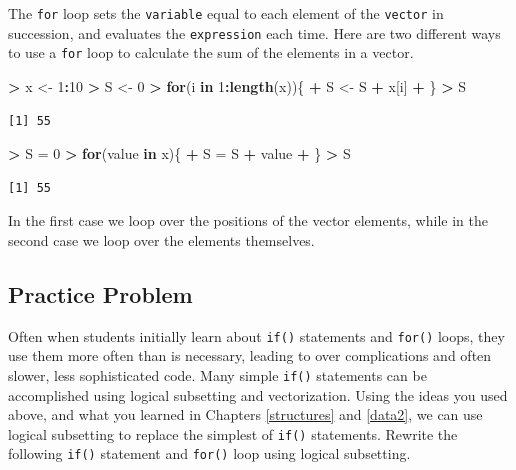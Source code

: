 \documentclass[]{krantz}
\makeatletter
\newenvironment{Shaded}{\begin{snugshade}}{\end{snugshade}}
\newcommand{\KeywordTok}[1]{\textcolor[rgb]{0.27,0.27,0.27}{\textbf{#1}}}
\newcommand{\DecValTok}[1]{\textcolor[rgb]{0.06,0.06,0.06}{#1}}
\newcommand{\StringTok}[1]{\textcolor[rgb]{0.5,0.5,0.5}{#1}}
\newcommand{\ControlFlowTok}[1]{\textcolor[rgb]{0.27,0.27,0.27}{\textbf{#1}}}
\newcommand{\OperatorTok}[1]{\textcolor[rgb]{0.43,0.43,0.43}{\textbf{#1}}}
\newcommand{\NormalTok}[1]{#1}
\newenvironment{kframe}{%
\medskip{}
\setlength{\fboxsep}{.8em}
 \def\at@end@of@kframe{}%
 \ifinner\ifhmode%
  \def\at@end@of@kframe{\end{minipage}}%
  \begin{minipage}{\columnwidth}%
 \fi\fi%
 \def\FrameCommand##1{\hskip\@totalleftmargin \hskip-\fboxsep
 \colorbox{shadecolor}{##1}\hskip-\fboxsep
     \hskip-\linewidth \hskip-\@totalleftmargin \hskip\columnwidth}%
 \MakeFramed {\advance\hsize-\width
   \@totalleftmargin\z@ \linewidth\hsize
   \@setminipage}}%
 {\par\unskip\endMakeFramed%
 \at@end@of@kframe}
\renewenvironment{Shaded}{\begin{kframe}}{\end{kframe}}
\makeatother
\begin{document}
The \texttt{for} loop sets the \texttt{variable} equal to each element
of the \texttt{vector} in succession, and evaluates the
\texttt{expression} each time. Here are two different ways to use a
\texttt{for} loop to calculate the sum of the elements in a vector.

\begin{Shaded}
\begin{Highlighting}[]
\OperatorTok{>}\StringTok{ }\NormalTok{x <-}\StringTok{ }\DecValTok{1}\OperatorTok{:}\DecValTok{10}
\OperatorTok{>}\StringTok{ }\NormalTok{S <-}\StringTok{ }\DecValTok{0}
\OperatorTok{>}\StringTok{ }\ControlFlowTok{for}\NormalTok{(i }\ControlFlowTok{in} \DecValTok{1}\OperatorTok{:}\KeywordTok{length}\NormalTok{(x))\{}
\OperatorTok{+}\StringTok{     }\NormalTok{S <-}\StringTok{ }\NormalTok{S }\OperatorTok{+}\StringTok{ }\NormalTok{x[i]}
\OperatorTok{+}\StringTok{ }\NormalTok{\}}
\OperatorTok{>}\StringTok{ }\NormalTok{S}
\end{Highlighting}
\end{Shaded}

\begin{verbatim}
[1] 55
\end{verbatim}

\begin{Shaded}
\begin{Highlighting}[]
\OperatorTok{>}\StringTok{ }\NormalTok{S =}\StringTok{ }\DecValTok{0}
\OperatorTok{>}\StringTok{ }\ControlFlowTok{for}\NormalTok{(value }\ControlFlowTok{in}\NormalTok{ x)\{}
\OperatorTok{+}\StringTok{   }\NormalTok{S =}\StringTok{ }\NormalTok{S }\OperatorTok{+}\StringTok{ }\NormalTok{value}
\OperatorTok{+}\StringTok{ }\NormalTok{\}}
\OperatorTok{>}\StringTok{ }\NormalTok{S}
\end{Highlighting}
\end{Shaded}

\begin{verbatim}
[1] 55
\end{verbatim}

In the first case we loop over the positions of the vector elements,
while in the second case we loop over the elements themselves.

\subsection{Practice Problem}\label{practice-problem-12}

Often when students initially learn about \texttt{if()} statements and
\texttt{for()} loops, they use them more often than is necessary,
leading to over complications and often slower, less sophisticated code.
Many simple \texttt{if()} statements can be accomplished using logical
subsetting and vectorization. Using the ideas you used above, and what
you learned in Chapters \ref{structures} and \ref{data2}, we can use
logical subsetting to replace the simplest of \texttt{if()} statements.
Rewrite the following \texttt{if()} statement and \texttt{for()} loop
using logical subsetting.
\end{document}
